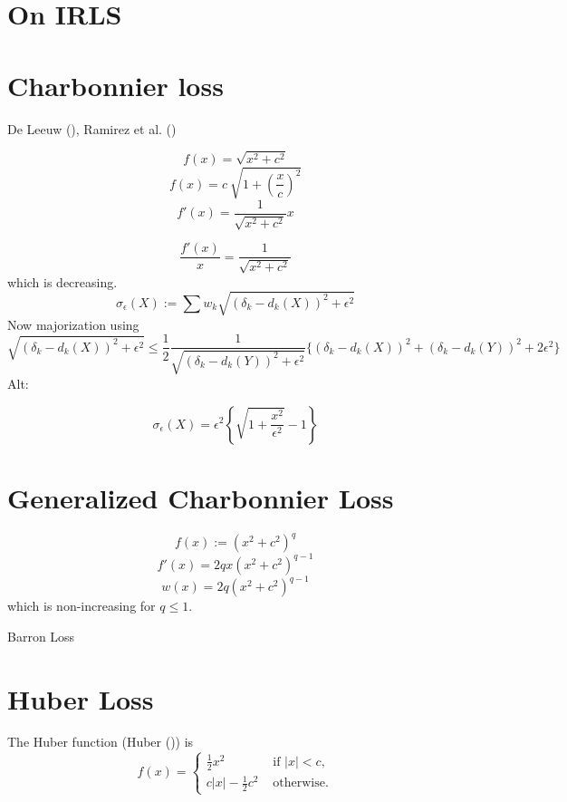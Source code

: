 \documentclass[
  12pt,
  letterpaper,
  DIV=11,
  numbers=noendperiod]{scrartcl}
\newcommand{\sectionbreak}{\pagebreak}
\begin{document}
\sectionbreak

\section{On IRLS}\label{on-irls}

\sectionbreak

\section{Charbonnier loss}\label{charbonnier-loss}

De Leeuw (), Ramirez et al.
()

\[
f(x)=\sqrt{x^2 + c^2}
\] \[
f(x)=c\ \sqrt{1+(\frac{x}{c})^2}
\] \[
f'(x)=\frac{1}{\sqrt{x^2+c^2}}x
\]

\[
\frac{f'(x)}{x}=\frac{1}{\sqrt{x^2+c^2}}
\] which is decreasing. \[
\sigma_\epsilon(X):=\sum w_k\sqrt{(\delta_k-d_k(X))^2+\epsilon^2}
\] Now majorization using \[
\sqrt{(\delta_k-d_k(X))^2+\epsilon^2}\leq\frac12\frac{1}{\sqrt{(\delta_k-d_k(Y))^2+\epsilon^2}}\{(\delta_k-d_k(X))^2+(\delta_k-d_k(Y))^2+2\epsilon^2\}
\] Alt:

\[
\sigma_\epsilon(X)=\epsilon^2\left\{\sqrt{1+\frac{x^2}{\epsilon^2}}-1\right\}
\]

\sectionbreak

\section{Generalized Charbonnier
Loss}\label{generalized-charbonnier-loss}

\[
f(x):=(x^2+c^2)^q
\] \[
f'(x)=2qx(x^2+c^2)^{q-1}
\] \[
w(x)=2q(x^2+c^2)^{q-1}
\] which is non-increasing for \(q\leq 1\).

Barron Loss

\sectionbreak

\section{Huber Loss}\label{huber-loss}

The Huber function (Huber ()) is \[
f(x)=\begin{cases}
\frac12x^2&\text{ if }|x|<c,\\
c|x|-\frac12 c^2&\text{ otherwise}.
\end{cases}
\]
\end{document}
